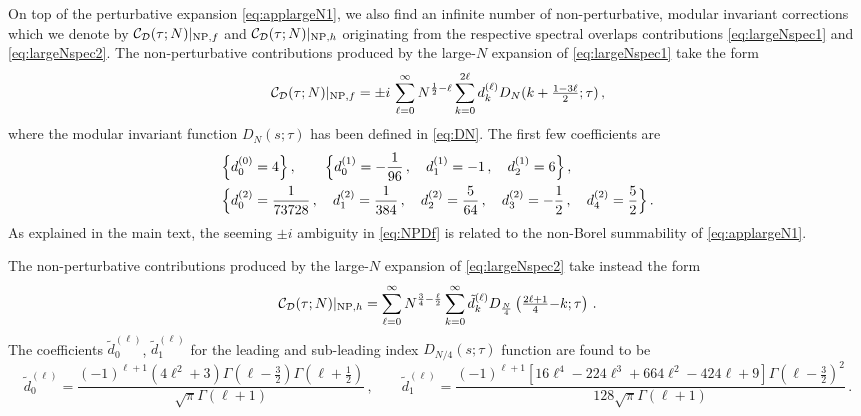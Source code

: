 \documentclass[aps,prl,twocolumn, longbibliography,footinbib,superscriptaddress, preprintnumbers]{revtex4-1}
\newcommand{\<}{\langle}
\renewcommand{\>}{\rangle}
\begin{document}
{On top of the perturbative expansion \eqref{eq:applargeN1}, we also find an infinite number of non-perturbative, modular invariant corrections which we denote by $ \mathcal{C}_\mathcal{D}(\tau; N)\vert_{{\rm NP},f}$ and  $ \mathcal{C}_\mathcal{D}(\tau; N)\vert_{{\rm NP},h}$ originating from the respective spectral overlaps contributions \eqref{eq:largeNspec1} and
\eqref{eq:largeNspec2}.
The non-perturbative contributions produced by the large-$N$ expansion of \eqref{eq:largeNspec1} take the form
\begin{equation}\label{eq:NPDf}
 \mathcal{C}_\mathcal{D}(\tau; N)\vert_{{\rm NP},f} = \pm i \, \sum_{\ell=0}^\infty N^{\frac{1}{2}-\ell} \sum_{k=0}^{2\ell} d_k^{(\ell)} D_N(k+\tfrac{1-3\ell}{2};\tau)\,,
\end{equation}
where the modular invariant function $D_N(s;\tau)$ has been defined in \eqref{eq:DN}.
The first few coefficients are
\begin{align}
&\Big\{ d_0^{(0)} = 4 \Big\}\,,\qquad \Big\{d_0^{(1)}= -\frac{1}{96}\,,\quad d_1^{(1)} = -1\,,\quad d_2^{(1)} = 6 \Big\}\,,\\
&\notag \Big\{ d_0^{(2)} = \frac{1}{73728}\,,\quad d_1^{(2)} =\frac{1}{384} \,,\quad d_2^{(2)} =\frac{5}{64} \,,\quad d_3^{(2)} = -\frac
{1}{2}\,,\quad d_4^{(2)} =\frac{5}{2} \Big\}\,.
\end{align}
As explained in the main text, the seeming $\pm i$ ambiguity in \eqref{eq:NPDf} is related to the non-Borel summability of \eqref{eq:applargeN1}.

The non-perturbative contributions produced by the large-$N$ expansion of \eqref{eq:largeNspec2} take instead the form
\begin{equation}\label{eq:NPDh}
 \mathcal{C}_\mathcal{D}(\tau; N)\vert_{{\rm NP},h} = \sum_{\ell=0}^\infty N^{\frac{3}{4}-\frac{\ell}{2}} \sum_{k=0}^\infty \tilde{d}_k^{(\ell)} D_{\frac{N}{4}}\left( \tfrac{2\ell+1}{4} {-} k ;\tau \right)\,.
\end{equation}
The coefficients $\tilde{d}^{(\ell)}_0$, $\tilde{d}^{(\ell)}_1$ for the leading and sub-leading index  $D_{N/4}(s;\tau)$ function are found to be
\begin{equation}\label{eq:dtilde}
\tilde{d}^{(\ell)}_0 = \frac{(-1)^{\ell+1} \left(4 \ell^2+3\right) \Gamma \left(\ell-\frac{3}{2}\right) \Gamma \left(\ell+\frac{1}{2}\right)}{\sqrt{\pi } \Gamma (\ell+1)}\,, \qquad \tilde{d}^{(\ell)}_1 =\frac{(-1)^{\ell+1 } \left[16 \ell^4-224 \ell^3+664 \ell^2-424 \ell+9 \right]  \Gamma \left(\ell-\frac{3}{2}\right)^2}{128 \sqrt{\pi } \Gamma (\ell+1)}\,.
\end{equation}

}
\end{document}
